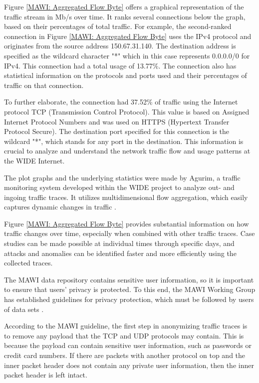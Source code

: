 \documentclass[sigconf,authorversion,nonacm]{acmart}
\begin{document}
Figure \ref{MAWI: Aggregated Flow Byte} offers a graphical representation of the traffic stream in Mb/s over time. It ranks several connections below the graph, based on their percentages of total traffic. For example, the second-ranked connection in Figure \ref{MAWI: Aggregated Flow Byte} uses the IPv4 protocol and originates from the source address 150.67.31.140. The destination address is specified as the wildcard character "*" which in this case represents 0.0.0.0/0 for IPv4. This connection had a total usage of 13.77\%. The connection also has statistical information on the protocols and ports used and their percentages of traffic on that connection. 

To further elaborate, the connection had 37.52\% of traffic using the Internet protocol TCP (Transmission Control Protocol). This value is based on Assigned Internet Protocol Numbers and was used on HTTPS (Hypertext Transfer Protocol Secure). The destination port specified for this connection is the wildcard "*", which stands for any port in the destination. This information is crucial to analyze and understand the network traffic flow and usage patterns at the WIDE Internet.

The plot graphs and the underlying statistics were made by Agurim, a traffic monitoring system developed within the WIDE project to analyze out- and ingoing traffic traces. It utilizes multidimensional flow aggregation, which easily captures dynamic changes in traffic \cite{179442}. 

Figure \ref{MAWI: Aggregated Flow Byte} provides substantial information on how traffic changes over time, especially when combined with other traffic traces. Case studies can be made possible at individual times through specific days, and attacks and anomalies can be identified faster and more efficiently using the collected traces.

The MAWI data repository contains sensitive user information, so it is important to ensure that users' privacy is protected. To this end, the MAWI Working Group has established guidelines for privacy protection, which must be followed by users of data sets \cite{MAWIGuideline}. 

According to the MAWI guideline, the first step in anonymizing traffic traces is to remove any payload that the TCP and UDP protocols may contain. This is because the payload can contain sensitive user information, such as passwords or credit card numbers. If there are packets with another protocol on top and the inner packet header does not contain any private user information, then the inner packet header is left intact.
\end{document}
